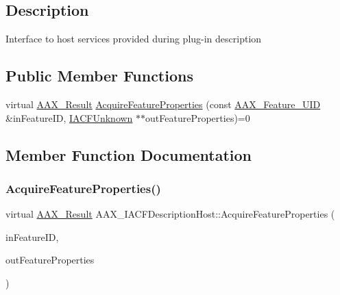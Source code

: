 \subsection{Description}
Interface to host services provided during plug-\/in description \subsection*{Public Member Functions}
\begin{DoxyCompactItemize}
\item 
virtual \mbox{\hyperlink{a00392_a4d8f69a697df7f70c3a8e9b8ee130d2f}{A\+A\+X\+\_\+\+Result}} \mbox{\hyperlink{a01649_ae4b0144bfdfdbd5881150c20eef1c48f}{Acquire\+Feature\+Properties}} (const \mbox{\hyperlink{a00392_a53d6cf8a08224b3e813333e411ce798e}{A\+A\+X\+\_\+\+Feature\+\_\+\+U\+ID}} \&in\+Feature\+ID, \mbox{\hyperlink{a01409}{I\+A\+C\+F\+Unknown}} $\ast$$\ast$out\+Feature\+Properties)=0
\end{DoxyCompactItemize}


\subsection{Member Function Documentation}
\mbox{\label{a01649_ae4b0144bfdfdbd5881150c20eef1c48f}} 
\subsubsection{\texorpdfstring{AcquireFeatureProperties()}{AcquireFeatureProperties()}}
{\footnotesize\ttfamily virtual \mbox{\hyperlink{a00392_a4d8f69a697df7f70c3a8e9b8ee130d2f}{A\+A\+X\+\_\+\+Result}} A\+A\+X\+\_\+\+I\+A\+C\+F\+Description\+Host\+::\+Acquire\+Feature\+Properties (\begin{DoxyParamCaption}\item[{const \mbox{\hyperlink{a00392_a53d6cf8a08224b3e813333e411ce798e}{A\+A\+X\+\_\+\+Feature\+\_\+\+U\+ID}} \&}]{in\+Feature\+ID,  }\item[{\mbox{\hyperlink{a01409}{I\+A\+C\+F\+Unknown}} $\ast$$\ast$}]{out\+Feature\+Properties }\end{DoxyParamCaption})\hspace{0.3cm}{\ttfamily [pure virtual]}}

